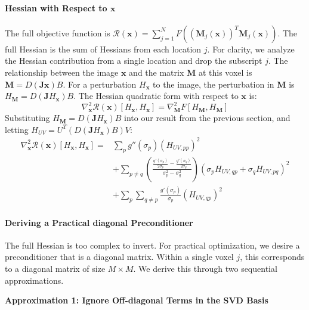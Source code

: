 \paragraph{Hessian with Respect to $\mathbf{x}$}
The full objective function is $\mathcal{R}(\mathbf{x}) = \sum_{j=1}^N F((\mathbf{M}_j(\mathbf{x}))^T\mathbf{M}_j(\mathbf{x}))$. The full Hessian is the sum of Hessians from each location $j$. For clarity, we analyze the Hessian contribution from a single location and drop the subscript $j$. The relationship between the image $\mathbf{x}$ and the matrix $\mathbf{M}$ at this voxel is $\mathbf{M} = D (\mathbf{J}\mathbf{x}) B$. For a perturbation $H_{\mathbf{x}}$ to the image, the perturbation in $\mathbf{M}$ is $H_{\mathbf{M}} = D (\mathbf{J}H_{\mathbf{x}}) B$. The Hessian quadratic form with respect to $\mathbf{x}$ is:
$$\nabla_{\mathbf{x}}^2 \mathcal{R}(\mathbf{x})[H_{\mathbf{x}},H_{\mathbf{x}}] = \nabla_{\mathbf{M}}^2 F[H_{\mathbf{M}}, H_{\mathbf{M}}]$$
Substituting $H_{\mathbf{M}} = D (\mathbf{J}H_{\mathbf{x}}) B$ into our result from the previous section, and letting $H_{UV} = U^T (D (\mathbf{J}H_{\mathbf{x}}) B) V$:
\begin{align*}
\nabla_{\mathbf{x}}^2 \mathcal{R}(\mathbf{x})[H_{\mathbf{x}},H_{\mathbf{x}}] = & \sum_p g''(\sigma_p) (H_{UV,pp})^2 \\
& + \sum_{p \neq q} \left(\frac{\frac{g'(\sigma_p)}{2\sigma_p} - \frac{g'(\sigma_q)}{2\sigma_q}}{\sigma_p^2 - \sigma_q^2}\right) (\sigma_p H_{UV,qp} + \sigma_q H_{UV,pq})^2 \\
& + \sum_p \sum_{q \neq p} \frac{g'(\sigma_p)}{\sigma_p} (H_{UV,qp})^2
\end{align*}

\paragraph{Deriving a Practical diagonal Preconditioner}
The full Hessian is too complex to invert. For practical optimization, we desire a preconditioner that is a diagonal matrix. Within a single voxel $j$, this corresponds to a diagonal matrix of size $M \times M$. We derive this through two sequential approximations.

\textbf{Approximation 1: Ignore Off-diagonal Terms in the SVD Basis}

